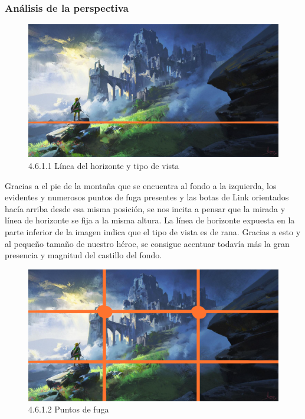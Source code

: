 \documentclass[12pt]{article}
\begin{document}
    
        \subsubsection{Análisis de la perspectiva}


    \begin{figure}[H]
      \centering
      \includegraphics[scale=0.4]{images/Nerea/Nerea Zelda concept 611.PNG}
      \caption{\small 4.6.1.1 Línea del horizonte y tipo de vista}
    \end{figure}

    Gracias a el pie de la montaña que se encuentra al fondo a la izquierda, los evidentes y numerosos puntos de fuga presentes y las botas de Link orientados hacía arriba desde esa misma posición, se nos incita a pensar que la mirada y línea de horizonte se fija a la misma altura. La línea de horizonte expuesta en la parte inferior de la imagen indica que el tipo de vista es de rana. 
    Gracias a esto y al pequeño tamaño de nuestro héroe, se consigue acentuar todavía más la gran presencia y magnitud del castillo del fondo.

    \begin{figure}[H]
      \centering
      \includegraphics[scale=0.4]{images/Nerea/Nerea Zelda concept 621.PNG}
      \caption{\small 4.6.1.2 Puntos de fuga}
    \end{figure}
\end{document}
